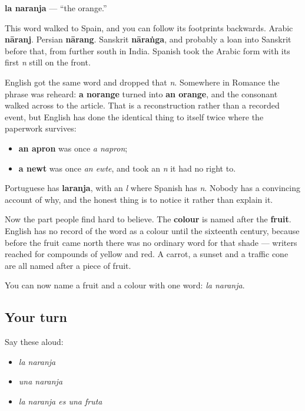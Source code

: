\begin{cousinweb}
\textbf{la naranja} — \textquotedblleft{}the orange.\textquotedblright{}

This word walked to Spain, and you can follow its footprints backwards. Arabic \textbf{nāranj}. Persian \textbf{nārang}. Sanskrit \textbf{nāraṅga}, and probably a loan into Sanskrit before that, from further south in India. Spanish took the Arabic form with its first \emph{n} still on the front.

English got the same word and dropped that \emph{n}. Somewhere in Romance the phrase was reheard: \textbf{a norange} turned into \textbf{an orange}, and the consonant walked across to the article. That is a reconstruction rather than a recorded event, but English has done the identical thing to itself twice where the paperwork survives:

\begin{itemize}
\raggedright
  \item \textbf{an apron} was once \emph{a napron};
  \item \textbf{a newt} was once \emph{an ewte}, and took an \emph{n} it had no right to.
\end{itemize}

Portuguese has \textbf{laranja}, with an \emph{l} where Spanish has \emph{n}. Nobody has a convincing account of why, and the honest thing is to notice it rather than explain it.

Now the part people find hard to believe. The \textbf{colour} is named after the \textbf{fruit}. English has no record of the word as a colour until the sixteenth century, because before the fruit came north there was no ordinary word for that shade — writers reached for compounds of yellow and red. A carrot, a sunset and a traffic cone are all named after a piece of fruit.
\end{cousinweb}

\begin{grammarlens}[title={What you've built}]
You can now name a fruit and a colour with one word: \emph{la naranja}.
\end{grammarlens}

\subsection*{Your turn}
Say these aloud:

\begin{itemize}
\raggedright
  \item \emph{la naranja}
  \item \emph{una naranja}
  \item \emph{la naranja es una fruta}
\end{itemize}

